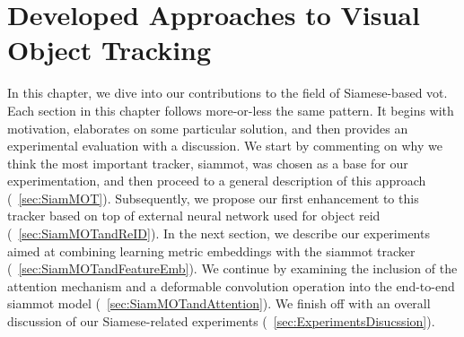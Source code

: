 \chapter{Developed Approaches to Visual Object Tracking}
\label{chap:DevelopedVisualTrackingApproaches}

In this chapter, we dive into our contributions to the field of Siamese-based \gls{vot}. Each section in this chapter follows more-or-less the same pattern. It begins with motivation, elaborates on some particular solution, and then provides an experimental evaluation with a discussion. We start by commenting on why we think the most important tracker, \gls{siammot}, was chosen as a base for our experimentation, and then proceed to a general description of this approach (\sectiontext{}~\ref{sec:SiamMOT}). Subsequently, we propose our first enhancement to this tracker based on top of external neural network used for object \gls{reid} (\sectiontext{}~\ref{sec:SiamMOTandReID}). In the next section, we describe our experiments aimed at combining learning metric embeddings with the \gls{siammot} tracker (\sectiontext{}~\ref{sec:SiamMOTandFeatureEmb}). We continue by examining the inclusion of the attention mechanism and a deformable convolution operation into the end-to-end \gls{siammot} model (\sectiontext{}~\ref{sec:SiamMOTandAttention}). We finish off with an overall discussion of our Siamese-related experiments (\sectiontext{}~\ref{sec:ExperimentsDisucssion}).






